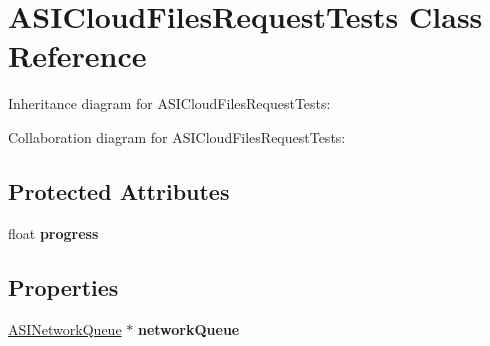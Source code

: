 \hypertarget{interface_a_s_i_cloud_files_request_tests}{
\section{\-A\-S\-I\-Cloud\-Files\-Request\-Tests \-Class \-Reference}
\label{interface_a_s_i_cloud_files_request_tests}
}


\-Inheritance diagram for \-A\-S\-I\-Cloud\-Files\-Request\-Tests\-:


\-Collaboration diagram for \-A\-S\-I\-Cloud\-Files\-Request\-Tests\-:
\subsection*{\-Protected \-Attributes}
\begin{DoxyCompactItemize}
\item 
\hypertarget{interface_a_s_i_cloud_files_request_tests_a81b1f6bdeec08337729015377e970505}{
float {\bfseries progress}}
\label{interface_a_s_i_cloud_files_request_tests_a81b1f6bdeec08337729015377e970505}

\end{DoxyCompactItemize}
\subsection*{\-Properties}
\begin{DoxyCompactItemize}
\item 
\hypertarget{interface_a_s_i_cloud_files_request_tests_a27f27472aa9c5c7c3a2863c3dbc6da1a}{
\hyperlink{interface_a_s_i_network_queue}{\-A\-S\-I\-Network\-Queue} $\ast$ {\bfseries network\-Queue}}
\label{interface_a_s_i_cloud_files_request_tests_a27f27472aa9c5c7c3a2863c3dbc6da1a}

\end{DoxyCompactItemize}


